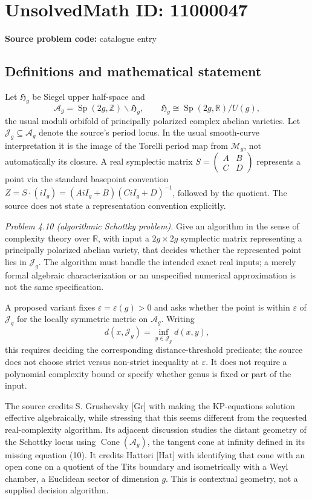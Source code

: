 \documentclass[11pt]{article}
\newcommand{\Z}{\mathbb{Z}}
\newcommand{\R}{\mathbb{R}}
\newcommand{\C}{\mathbb{C}}
\newcommand{\eps}{\varepsilon}
\begin{document}
\section*{UnsolvedMath ID: 11000047}
\textbf{Source problem code:} catalogue entry
\subsection{Definitions and mathematical statement}
Let \(\mathfrak H_g\) be Siegel upper half-space and
\[
 \mathcal A_g=\operatorname{Sp}(2g,\Z)\backslash\mathfrak H_g,
 \qquad \mathfrak H_g\cong\operatorname{Sp}(2g,\R)/U(g),
\]
the usual moduli orbifold of principally polarized complex abelian varieties. Let \(\mathcal J_g\subseteq\mathcal A_g\) denote the source's period locus. In the usual smooth-curve interpretation it is the image of the Torelli period map from \(\mathcal M_g\), not automatically its closure. A real symplectic matrix \(S=\left(\begin{smallmatrix}A&B\\C&D\end{smallmatrix}\right)\) represents a point via the standard basepoint convention \(Z=S\cdot(iI_g)=(AiI_g+B)(CiI_g+D)^{-1}\), followed by the quotient. The source does not state a representation convention explicitly.

\emph{Problem 4.10 (algorithmic Schottky problem).} Give an algorithm in the sense of complexity theory over \(\R\), with input a \(2g\times2g\) symplectic matrix representing a principally polarized abelian variety, that decides whether the represented point lies in \(\mathcal J_g\). The algorithm must handle the intended exact real inputs; a merely formal algebraic characterization or an unspecified numerical approximation is not the same specification.

A proposed variant fixes \(\eps=\eps(g)>0\) and asks whether the point is within \(\eps\) of \(\mathcal J_g\) for the locally symmetric metric on \(\mathcal A_g\). Writing
\[
 d(x,\mathcal J_g)=\inf_{y\in\mathcal J_g}d(x,y),
\]
this requires deciding the corresponding distance-threshold predicate; the source does not choose strict versus non-strict inequality at \(\eps\). It does not require a polynomial complexity bound or specify whether genus is fixed or part of the input.

The source credits S. Grushevsky [Gr] with making the KP-equations solution effective algebraically, while stressing that this seems different from the requested real-complexity algorithm. Its adjacent discussion studies the distant geometry of the Schottky locus using \(\operatorname{Cone}(\mathcal A_g)\), the tangent cone at infinity defined in its missing equation (10). It credits Hattori [Hat] with identifying that cone with an open cone on a quotient of the Tits boundary and isometrically with a Weyl chamber, a Euclidean sector of dimension \(g\). This is contextual geometry, not a supplied decision algorithm.
\end{document}
